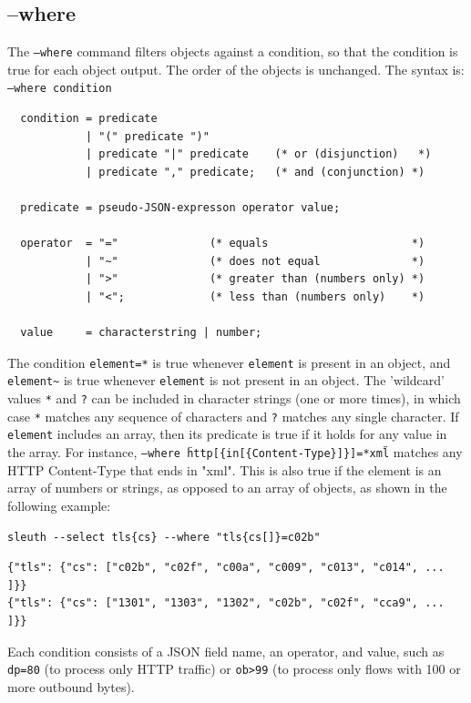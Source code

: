 \documentclass{book}
\begin{document}
\subsection{--where}
The \texttt{--where} command filters objects against a condition, so that the
condition is true for each object output.  The order of the objects
is unchanged.  The syntax is:
\texttt{--where condition}
\begin{verbatim}
  condition = predicate 
            | "(" predicate ")" 
            | predicate "|" predicate    (* or (disjunction)   *)
            | predicate "," predicate;   (* and (conjunction) *)
 
  predicate = pseudo-JSON-expresson operator value;

  operator  = "="              (* equals                      *)
            | "~"              (* does not equal              *)
            | ">"              (* greater than (numbers only) *)
            | "<";             (* less than (numbers only)    *)

  value     = characterstring | number;
\end{verbatim}
The condition \texttt{element=*} is true whenever \texttt{element} is present in
an object, and \texttt{element\textasciitilde*} is true whenever \texttt{element} is not present
in an object.  The 'wildcard' values \texttt{*} and \texttt{?} can be included in
character strings (one or more times), in which case \texttt{*} matches any
sequence of characters and \texttt{?} matches any single character.  If
\texttt{element} includes an array, then its predicate is true if it holds
for any value in the array.  For instance, \texttt{--where
\"http[\{in[\{Content-Type\}]\}]=*xml\"} matches any HTTP Content-Type that
ends in "xml".  This is also true if the element is an array of numbers or strings, as
opposed to an array of objects, as shown in the following example:
\begin{mdframed}[style=cli]
  \begin{verbatim}
sleuth --select tls{cs} --where "tls{cs[]}=c02b"
  \end{verbatim}
  \begin{verbatim}
{"tls": {"cs": ["c02b", "c02f", "c00a", "c009", "c013", "c014", ... ]}}
{"tls": {"cs": ["1301", "1303", "1302", "c02b", "c02f", "cca9", ... ]}}
  \end{verbatim}
\end{mdframed}

Each condition consists of a JSON field name, an operator, and value,
such as \texttt{dp=80} (to process only HTTP traffic) or
\texttt{ob>99} (to process only flows with 100 or more outbound
bytes).  
\end{document}
